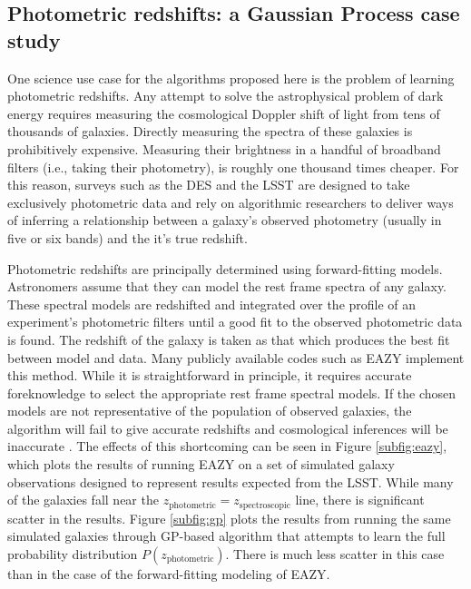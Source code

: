 \documentclass[useAMS,usenatbib,tightenlines,11pt,preprint]{aastex}
\begin{document}
\subsection{Photometric redshifts: a Gaussian Process case study}
\label{sec:photoz}

One science use case for the algorithms proposed here is the problem of learning
photometric redshifts.  Any attempt to solve the astrophysical problem of dark
energy requires measuring the cosmological Doppler shift of light from tens of
thousands of galaxies.  Directly measuring the spectra of these galaxies is
prohibitively expensive.  Measuring their brightness in a handful of broadband
filters (i.e., taking their photometry), is roughly one thousand times cheaper. 
For this reason, surveys such as the DES and the LSST are designed to take
exclusively photometric data and rely on algorithmic researchers to deliver ways
of inferring a relationship between a galaxy's observed photometry (usually in five or
six bands) and the it's true redshift.

Photometric redshifts are principally determined using
forward-fitting models.  Astronomers assume that they can model the rest frame
spectra of any galaxy.  These spectral models are
redshifted and integrated over the profile of an experiment's
photometric filters until a good fit to the observed photometric data is
found.  The redshift of the galaxy is taken as that which produces the best fit
between model and data.  Many publicly available codes such as 
EAZY \cite{eazy} implement this method.  
While it is straightforward in principle, it requires
accurate foreknowledge to select the appropriate rest frame 
spectral models.  If the chosen
models are not representative of the population of observed
galaxies, the algorithm will fail to give accurate redshifts and cosmological
inferences will be inaccurate \cite{budavari2008}.  The effects of this
shortcoming can be seen in Figure \ref{subfig:eazy}, which plots the results
of running EAZY on a set of
simulated galaxy observations designed to represent results expected from the
LSST.
While many of the galaxies fall near the
$z_\text{photometric}=z_\text{spectroscopic}$ line, there is significant scatter
in the results.  Figure \ref{subfig:gp} plots the results from running the same
simulated galaxies through GP-based algorithm that attempts to learn the full
probability distribution $P(z_\text{photometric})$.  There is much less scatter
in this case than in the case of the forward-fitting modeling of EAZY.
\end{document}
